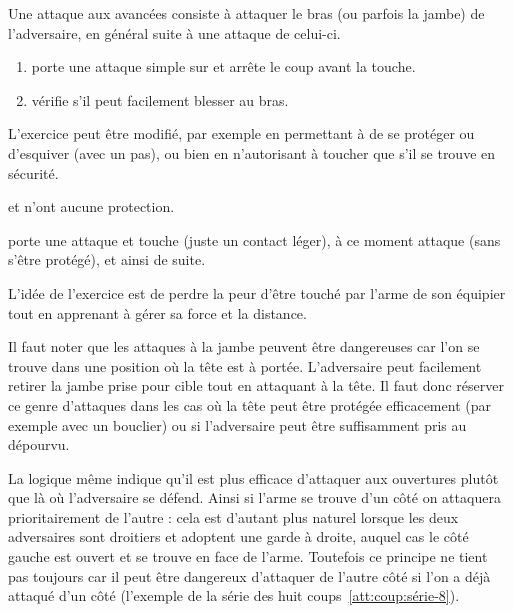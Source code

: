 \begin{coup}

Une attaque aux avancées consiste à attaquer le bras (ou parfois la jambe) de l'adversaire, en général suite à une attaque de celui-ci.

\end{coup}


\begin{exercice}

\begin{enumerate}
	\item \A porte une attaque simple sur \D et arrête le coup avant la touche.
	
	\item \D vérifie s'il peut facilement blesser \A au bras.
\end{enumerate}

L'exercice peut être modifié, par exemple en permettant à \D de se protéger ou d'esquiver (avec un pas), ou bien en n'autorisant \D à toucher \A que s'il se trouve en sécurité.
\end{exercice}


\begin{exercice}
\A et \D n'ont aucune protection.

\A porte une attaque et touche \D (juste un contact léger), à ce moment \D attaque \A (sans s'être protégé), et ainsi de suite.

L'idée de l'exercice est de perdre la peur d'être touché par l'arme de son équipier tout en apprenant à gérer sa force et la distance.
\end{exercice}


Il faut noter que les attaques à la jambe peuvent être dangereuses car l'on se trouve dans une position où la tête est à portée.
L'adversaire peut facilement retirer la jambe prise pour cible tout en attaquant à la tête.
Il faut donc réserver ce genre d'attaques dans les cas où la tête peut être protégée efficacement (par exemple avec un bouclier) ou si l'adversaire peut être suffisamment pris au dépourvu.

La logique même indique qu'il est plus efficace d'attaquer aux ouvertures plutôt que là où l'adversaire se défend.
Ainsi si l'arme se trouve d'un côté on attaquera prioritairement de l'autre : cela est d'autant plus naturel lorsque les deux adversaires sont droitiers et adoptent une garde à droite, auquel cas le côté gauche est ouvert et se trouve en face de l'arme.
Toutefois ce principe ne tient pas toujours car il peut être dangereux d'attaquer de l'autre côté si l'on a déjà attaqué d'un côté (l'exemple de la série des huit coups~\ref{att:coup:série-8}).

